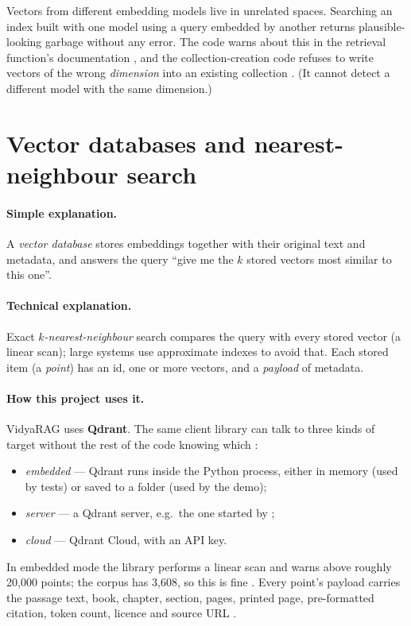 \begin{keyidea}
Vectors from different embedding models live in unrelated spaces. Searching an index built with one model using a query embedded by another returns plausible-looking garbage without any error. The code warns about this in the retrieval function's documentation , and the collection-creation code refuses to write vectors of the wrong \emph{dimension} into an existing collection . (It cannot detect a different model with the same dimension.)
\end{keyidea}

\section{Vector databases and nearest-neighbour search}

\paragraph{Simple explanation.} A \emph{vector database} stores embeddings together with their original text and metadata, and answers the query ``give me the $k$ stored vectors most similar to this one''.

\paragraph{Technical explanation.} Exact \emph{$k$-nearest-neighbour} search compares the query with every stored vector (a linear scan); large systems use approximate indexes to avoid that. Each stored item (a \emph{point}) has an id, one or more vectors, and a \emph{payload} of metadata.

\paragraph{How this project uses it.} VidyaRAG uses \textbf{Qdrant}. The same client library can talk to three kinds of target without the rest of the code knowing which :
\begin{itemize}
  \item \emph{embedded} --- Qdrant runs inside the Python process, either in memory (used by tests) or saved to a folder (used by the demo);
  \item \emph{server} --- a Qdrant server, e.g.\ the one started by ;
  \item \emph{cloud} --- Qdrant Cloud, with an API key.
\end{itemize}
In embedded mode the library performs a linear scan and warns above roughly 20,000 points; the corpus has 3,608, so this is fine . Every point's payload carries the passage text, book, chapter, section, pages, printed page, pre-formatted citation, token count, licence and source URL .

